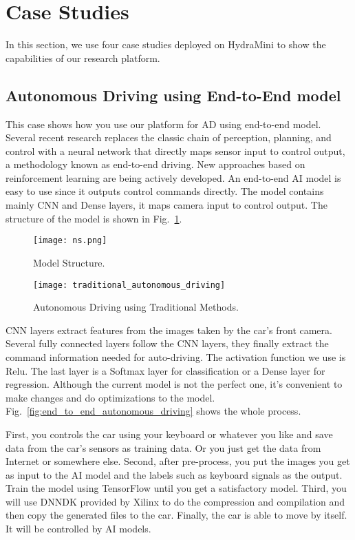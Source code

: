 \section{Case Studies}
In this section, we use four case studies deployed on HydraMini to show the capabilities of our research platform.

\subsection{Autonomous Driving using End-to-End model}
This case shows how you use our platform for AD using end-to-end model. Several recent research replaces the classic chain of perception, planning, and control with a neural network that directly maps sensor input to control output\cite{bojarski2016end, chi2017deep, eraqi2017end}, a methodology known as end-to-end driving. New approaches based on reinforcement learning are being actively developed\cite{kendall2019learning}. An end-to-end AI model is easy to use since it outputs control commands directly. The model contains mainly CNN and Dense layers\cite{keras}, it maps camera input to control output. The structure of the model is shown in Fig.~\ref{ms}.

\begin{figure}[b]
\centerline{\texttt{[image: ns.png]}}
\caption{Model Structure.}
\label{ms}
\end{figure}

\begin{figure*}[t]
    \centering
    \texttt{[image: traditional\_autonomous\_driving]}
    \caption{Autonomous Driving using Traditional Methods.}
    \label{fig:traditional_autonomous_driving}
\end{figure*}

CNN layers extract features from the images taken by the car's front camera. Several fully connected layers follow the CNN layers, they finally extract the command information needed for auto-driving. The activation function we use is Relu. The last layer is a Softmax layer\cite{keras} for classification or a Dense layer for regression. Although the current model is not the perfect one, it's convenient to make changes and do optimizations to the model. Fig.~\ref{fig:end_to_end_autonomous_driving} shows the whole process.

First, you controls the car using your keyboard or whatever you like and save data from the car's sensors as training data. Or you just get the data from Internet or somewhere else. Second, after pre-process, you put the images you get as input to the AI model and the labels such as keyboard signals as the output. Train the model using TensorFlow until you get a satisfactory model. Third, you will use DNNDK\cite{dnndk} provided by Xilinx to do the compression and compilation and then copy the generated files to the car. Finally, the car is able to move by itself. It will be controlled by AI models. 

